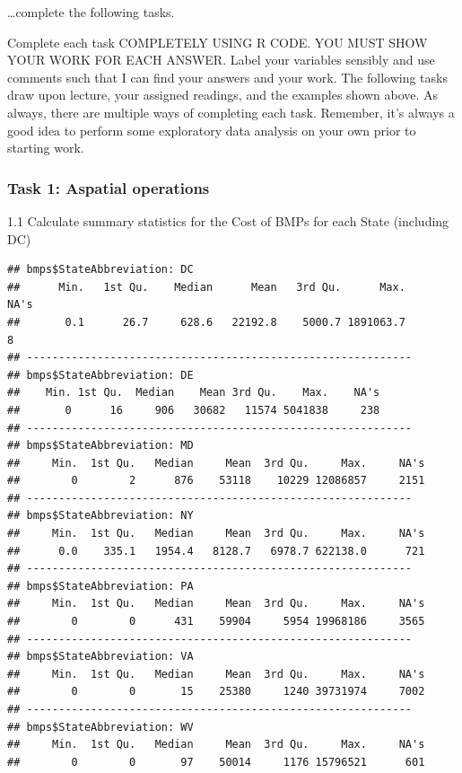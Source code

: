 \documentclass[
]{article}
\newenvironment{Shaded}{\begin{snugshade}}{\end{snugshade}}
\newcommand{\CommentTok}[1]{\textcolor[rgb]{0.56,0.35,0.01}{\textit{#1}}}
\newcommand{\FunctionTok}[1]{\textcolor[rgb]{0.13,0.29,0.53}{\textbf{#1}}}
\newcommand{\NormalTok}[1]{#1}
\newcommand{\SpecialCharTok}[1]{\textcolor[rgb]{0.81,0.36,0.00}{\textbf{#1}}}
\begin{document}
\ldots complete the following tasks.

Complete each task COMPLETELY USING R CODE. YOU MUST SHOW YOUR WORK FOR
EACH ANSWER. Label your variables sensibly and use comments such that I
can find your answers and your work. The following tasks draw upon
lecture, your assigned readings, and the examples shown above. As
always, there are multiple ways of completing each task. Remember, it's
always a good idea to perform some exploratory data analysis on your own
prior to starting work.

\subsubsection{Task 1: Aspatial
operations}\label{task-1-aspatial-operations}

1.1 Calculate summary statistics for the Cost of BMPs for each State
(including DC)

\begin{Shaded}
\end{Shaded}

\begin{verbatim}
## bmps$StateAbbreviation: DC
##      Min.   1st Qu.    Median      Mean   3rd Qu.      Max.      NA's 
##       0.1      26.7     628.6   22192.8    5000.7 1891063.7         8 
## ------------------------------------------------------------ 
## bmps$StateAbbreviation: DE
##    Min. 1st Qu.  Median    Mean 3rd Qu.    Max.    NA's 
##       0      16     906   30682   11574 5041838     238 
## ------------------------------------------------------------ 
## bmps$StateAbbreviation: MD
##     Min.  1st Qu.   Median     Mean  3rd Qu.     Max.     NA's 
##        0        2      876    53118    10229 12086857     2151 
## ------------------------------------------------------------ 
## bmps$StateAbbreviation: NY
##     Min.  1st Qu.   Median     Mean  3rd Qu.     Max.     NA's 
##      0.0    335.1   1954.4   8128.7   6978.7 622138.0      721 
## ------------------------------------------------------------ 
## bmps$StateAbbreviation: PA
##     Min.  1st Qu.   Median     Mean  3rd Qu.     Max.     NA's 
##        0        0      431    59904     5954 19968186     3565 
## ------------------------------------------------------------ 
## bmps$StateAbbreviation: VA
##     Min.  1st Qu.   Median     Mean  3rd Qu.     Max.     NA's 
##        0        0       15    25380     1240 39731974     7002 
## ------------------------------------------------------------ 
## bmps$StateAbbreviation: WV
##     Min.  1st Qu.   Median     Mean  3rd Qu.     Max.     NA's 
##        0        0       97    50014     1176 15796521      601
\end{verbatim}
\end{document}
